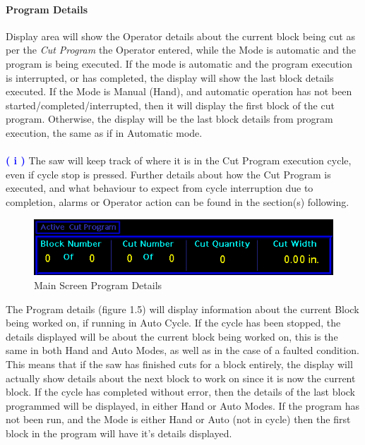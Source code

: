 \paragraph{Program Details} Display area will show the Operator details about the current block being cut as per the \textit{Cut Program} the Operator entered, while the Mode is automatic and the program is being executed. If the mode is automatic and the program execution is interrupted, or has completed, the display will show the last block details executed. If the Mode is Manual (Hand), and automatic operation has not been started/completed/interrupted, then it will display the first block of the cut program. Otherwise, the display will be the last block details from program execution, the same as if in Automatic mode. 
\\
\\
\textbf{\LARGE \textcolor{blue}{( i )}} The saw will keep track of where it is in the Cut Program execution cycle, even if cycle stop is pressed. Further details about how the Cut Program is executed, and what behaviour to expect from cycle interruption due to completion, alarms or Operator action can be found in the section(s) following.
\begin{figure}
	\centering
	\includegraphics[width=.95\linewidth]{screen-captures/main-screen-prg-det}
	\caption{Main Screen Program Details}
	\label{fig:main-prg-det}
\end{figure}
The Program details (figure 1.5) will display information about the current Block being worked on, if running in Auto Cycle. If the cycle has been stopped, the details displayed will be about the current block being worked on, this is the same in both Hand and Auto Modes, as well as in the case of a faulted condition. This means that if the saw has finished cuts for a block entirely, the display will actually show details about the next block to work on since it is now the current block. If the cycle has completed without error, then the details of the last block programmed will be displayed, in either Hand or Auto Modes. If the program has not been run, and the Mode is either Hand or Auto (not in cycle) then the first block in the program will have it's details displayed. 
\\
\\
